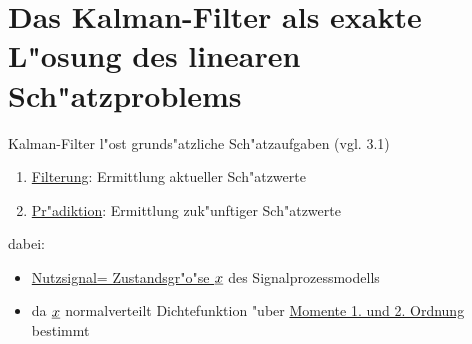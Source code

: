 \documentclass[openany,a4paper,11pt]{book}
\begin{document}
\section{Das Kalman-Filter als exakte L"osung des linearen Sch"atzproblems}
Kalman-Filter l"ost grunds"atzliche Sch"atzaufgaben (vgl. 3.1)\begin{enumerate}
    \item \uline{Filterung}: Ermittlung aktueller Sch"atzwerte
    \item \uline{Pr"adiktion}: Ermittlung zuk"unftiger Sch"atzwerte
\end{enumerate}
dabei:\begin{itemize}
    \item \uline{Nutzsignal= Zustandsgr"o"se $\uline{x}$} des Signalprozessmodells
    \item da $\uline{x}$ normalverteilt Dichtefunktion "uber \uline{Momente 1. und 2. Ordnung} bestimmt
\end{itemize}
\end{document}
